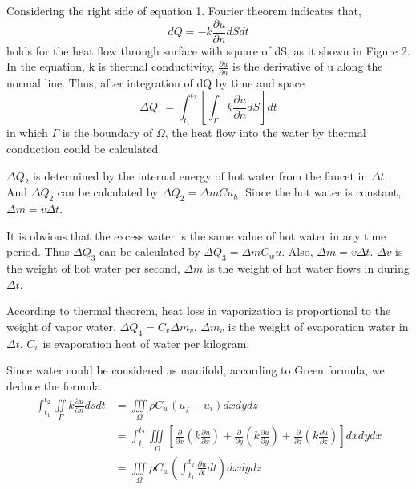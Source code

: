 \documentclass[12pt,a4paper,titlepage]{article}
\begin{document}
Considering the right side of equation 1.
Fourier theorem indicates that,
\begin{equation}
 dQ=-k\frac{\partial u}{\partial n}dSdt
\end{equation}
holds for the heat flow through surface with square of dS, as it shown in Figure 2.
In the equation, k is thermal conductivity, $\frac{\partial u}{\partial n}$ is the derivative of u along the normal line. Thus, after integration of dQ by time and space
\begin{equation}
 \Delta Q_1=\int_{t_1}^{t_2}[{\int_{\Gamma}}k\frac{\partial u}{\partial n}dS]dt
\end{equation}
in which $\Gamma$ is the boundary of $\Omega$,
the heat flow into the water by thermal conduction could be calculated.

$\Delta Q_2$ is determined by the internal energy of hot water from the faucet in $\Delta t$.
And $\Delta Q_2$ can be calculated by
$\Delta Q_2={\Delta m}C{u_h}$.
Since the hot water is constant,
$\Delta m=v{\Delta t}$.

It is obvious that the excess water is the same value of hot water in any time period.
Thus $\Delta Q_3$ can be calculated by
$\Delta Q_3={\Delta m}{C_w}u$.
Also, $\Delta m=v{\Delta t}$.
$\Delta v$ is the weight of hot water per second, $\Delta m$ is the weight of hot water flows in during $\Delta t$.

According to thermal theorem, heat loss in vaporization is proportional to the weight of vapor water.
$\Delta Q_4={C_v}\Delta {m_v}$.
$\Delta {m_v}$ is the weight of evaporation water in $\Delta t$, ${C_v}$ is evaporation heat of water per kilogram.

Since water could be considered as manifold, according to Green formula, we deduce the formula
\begin{displaymath}
\begin{aligned}
\int_{t_1}^{t_2} \iint\limits_{\Gamma}k\frac{\partial u}{\partial n}dsdt & =\iiint\limits_{\Omega}\rho C_{w}(u_f - u_i)dx dy dz\\
& =\int_{t_1}^{t_2}\iiint\limits_{\Omega}[\frac{\partial}{\partial x}(k\frac{\partial u}{\partial x})+\frac{\partial}{\partial y}(k\frac{\partial u}{\partial y})+\frac{\partial}{\partial z}(k\frac{\partial u}{\partial z})]dxdydx\\
& = \iiint\limits_{\Omega}\rho C_{w}(\int_{t_1}^{t_2}\frac{\partial u}{\partial t}dt)dxdydz
\end{aligned}
\end{displaymath}
\end{document}

